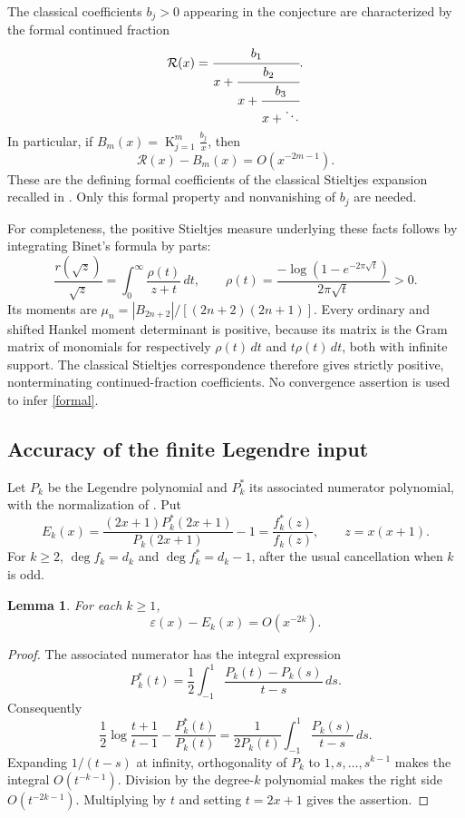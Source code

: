 \documentclass[11pt]{article}
\newtheorem{lemma}{Lemma}
\newcommand{\CF}[2]{\mathop{\mathrm K}_{j=1}^{#1}\frac{#2_j}{x}}
\begin{document}
The classical coefficients \(b_j>0\) appearing in the conjecture
are characterized by the formal continued fraction
\[
 \mathcal R(x)=\cfrac{b_1}{x+\cfrac{b_2}{x+\cfrac{b_3}{x+\ddots}}}.
\]
In particular, if \(B_m(x)=\CF{m}{b}\), then
\begin{equation}\label{formal}
 \mathcal R(x)-B_m(x)=O(x^{-2m-1}).
\end{equation}
These are the defining formal coefficients of the classical
Stieltjes expansion recalled in \cite[Section 6]{BR}.
Only this formal property and nonvanishing of \(b_j\) are needed.

For completeness, the positive Stieltjes measure underlying these
facts follows by integrating Binet's formula by parts:
\[
 \frac{r(\sqrt z)}{\sqrt z}
 =\int_0^\infty\frac{\rho(t)}{z+t}\,dt,\qquad
 \rho(t)=\frac{-\log(1-e^{-2\pi\sqrt t})}{2\pi\sqrt t}>0.
\]
Its moments are
\(\mu_n=|B_{2n+2}|/[(2n+2)(2n+1)]\).
Every ordinary and shifted Hankel moment determinant is positive,
because its matrix is the Gram matrix of monomials for respectively
\(\rho(t)\,dt\) and \(t\rho(t)\,dt\), both with infinite support.
The classical Stieltjes correspondence therefore gives strictly
positive, nonterminating continued-fraction coefficients.
No convergence assertion is used to infer \eqref{formal}.

\subsection*{Accuracy of the finite Legendre input}
Let \(P_k\) be the Legendre polynomial and \(P_k^*\) its associated
numerator polynomial, with the normalization of \cite[Section 2]{BR}.
Put
\[
 E_k(x)=\frac{(2x+1)P_k^*(2x+1)}{P_k(2x+1)}-1
       =\frac{f_k^*(z)}{f_k(z)},\qquad z=x(x+1).
\]
For \(k\geq2\), \(\deg f_k=d_k\) and \(\deg f_k^*=d_k-1\), after the
usual cancellation when \(k\) is odd.

\begin{lemma}\label{Legendre}
For each \(k\geq1\),
\[
 \varepsilon(x)-E_k(x)=O(x^{-2k}).
\]
\end{lemma}
\begin{proof}
The associated numerator has the integral expression
\[
 P_k^*(t)=\frac12\int_{-1}^1\frac{P_k(t)-P_k(s)}{t-s}\,ds.
\]
Consequently
\[
 \frac12\log\frac{t+1}{t-1}-\frac{P_k^*(t)}{P_k(t)}
 =\frac1{2P_k(t)}\int_{-1}^1\frac{P_k(s)}{t-s}\,ds.
\]
Expanding \(1/(t-s)\) at infinity, orthogonality of \(P_k\)
to \(1,s,\ldots,s^{k-1}\) makes the integral \(O(t^{-k-1})\).
Division by the degree-\(k\) polynomial makes the right side
\(O(t^{-2k-1})\). Multiplying by \(t\) and setting \(t=2x+1\)
gives the assertion.
\end{proof}
\end{document}
